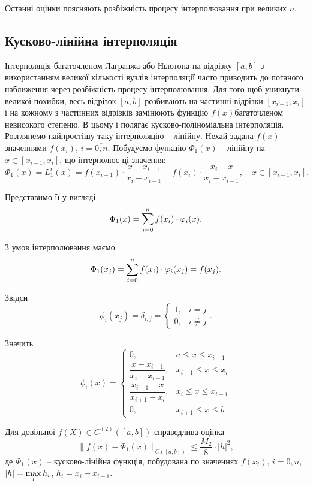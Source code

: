 Останні оцінки поясняють розбіжність процесу інтерполювання при великих $n$.

\subsection{Кусково-лінійна інтерполяція}

Інтерполяція багаточленом Лагранжа або Ньютона на відрізку $[a,b]$ з використанням великої кількості вузлів інтерполяції часто приводить до поганого наближення через розбіжність процесу інтерполювання. Для того щоб уникнути великої похибки, весь відрізок $[a,b]$ розбивають на частинні відрізки $[x_{i-1}, x_i]$ і на кожному з частинних відрізків замінюють функцію $f(x)$багаточленом невисокого степеню. В цьому і полягає кусково-поліноміальна інтерполяція. \\

Розглянемо найпростішу таку інтерполяцію -- лінійну. Нехай задана $f(x)$ значеннями $f(x_i)$, $i=\overline{0,n}$. Побудуємо функцію $\Phi_1(x)$ -- лінійну на $x\in[x_{i-1},x_i]$, що інтерполює ці значення:
\begin{equation}
    \label{eq:6.21}
    \Phi_1(x) = L_1^i(x) = f(x_{i-1})\cdot \dfrac{x-x_{i-1}}{x_i-x_{i-1}} + f(x_i) \cdot \dfrac{x_i-x}{x_i-x_{i-1}}, \quad x \in [x_{i-1}, x_i].
\end{equation}

Представимо її у вигляді
\begin{equation}
    \label{eq:6.22}
    \Phi_1(x) = \displaystyle\sum\limits_{i=0}^n f(x_i) \cdot \varphi_i(x).
\end{equation}

З умов інтерполювання маємо
\[ \Phi_1(x_j) = \displaystyle\sum\limits_{i=0}^n f(x_i) \cdot \varphi_i(x_j) = f(x_j). \]

Звідси 
\[ \phi_i(x_j) = \delta_{i,j} = \begin{cases} 1, & i = j \\ 0, & i \ne j \end{cases}. \]

Значить
\[ \phi_i(x) = \begin{cases} 0, & a \le x \le x_{i-1} \\ \dfrac{x-x_{i-1}}{x_i-x_{i-1}}, & x_{i-1} \le x \le x_i \\ \dfrac{x_{i+1}-x}{x_{i+1}-x_i}, & x_i \le x \le x_{i+1} \\ 0, & x_{i+1} \le x \le b \end{cases} \]

\begin{theorem}
    Для довільної $f(X) \in C^{(2)}([a,b])$ справедлива оцінка
    \begin{equation}
        \label{eq:6.23}
        \|f(x)-\Phi_1(x)\|_{C([a,b])} \le \dfrac{M_2}{8}\cdot|h|^2,
    \end{equation}
    де $\Phi_1(x)$ -- кусково-лінійна функція, побудована по значеннях $f(x_i)$, $i=\overline{0,n}$, $|h|=\displaystyle\max\limits_i h_i$, $h_i = x_i - x_{i-1}$.
\end{theorem}

